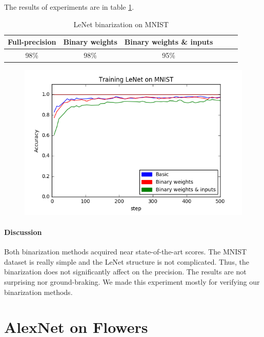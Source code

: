 \documentclass[licencjacka]{pracamgr}
\begin{document}
		        The results of experiments are in table \ref{table:1}.
		        \begin{table}[H]
                    \caption{LeNet binarization on MNIST}
                    \centering
                    \begin{tabular}{c c c c c c}
                    \hline\hline
			    Full-precision & Binary weights & Binary weights \& inputs \\ [0.5ex]
                    \hline
			    98\% & 98\% & 95\% \\
                    \hline
                    \end{tabular}
                    \label{table:1}
	            \end{table}
	            \begin{figure}[h]
				\centering
				\includegraphics[width=\textwidth]{images/LeNet-training}
			\end{figure}
		        \paragraph{Discussion} 
			Both binarization methods acquired near state-of-the-art scores. The MNIST dataset is really simple and the LeNet structure is not complicated. Thus, the binarization does not significantly affect on the precision. The results are not surprising nor ground-braking. We made this experiment mostly for verifying our binarization methods.
	\section{AlexNet on Flowers}
\end{document}
